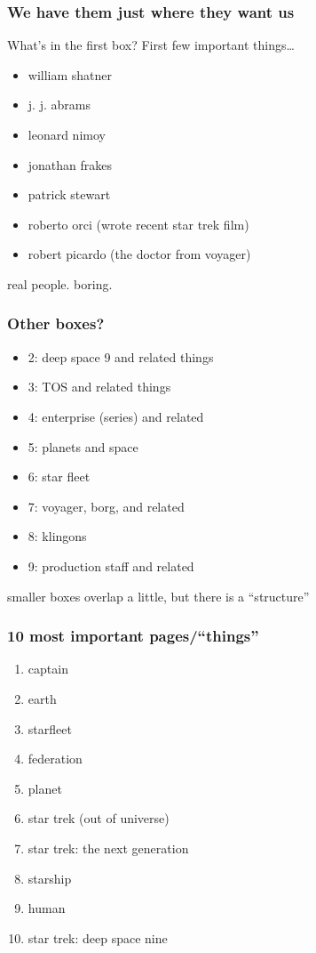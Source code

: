 \documentclass{beamer}
\begin{document}
\begin{frame}
  \frametitle{We have them just where they want us}
  What's in the first box? First few important things\ldots

  \begin{itemize}
    \item william shatner
    \item j. j. abrams
    \item leonard nimoy
    \item jonathan frakes
    \item patrick stewart
    \item roberto orci (wrote recent star trek film)
    \item robert picardo (the doctor from voyager)
  \end{itemize}

  real people. boring.
\end{frame}

\begin{frame}
  \frametitle{Other boxes?}
    \begin{itemize}
      \item 2: deep space 9 and related things
      \item 3: TOS and related things
      \item 4: enterprise (series) and related
      \item 5: planets and space
      \item 6: star fleet
      \item 7: voyager, borg, and related
      \item 8: klingons
      \item 9: production staff and related
    \end{itemize}

    smaller boxes overlap a little, but there is a ``structure''
\end{frame}

\begin{frame}
  \frametitle{10 most important pages/``things''}
  \begin{enumerate}
    \item<10-> captain
    \item<9-> earth
    \item<8-> starfleet
    \item<7-> federation
    \item<6-> planet
    \item<5-> star trek (out of universe)
    \item<4-> star trek: the next generation
    \item<3-> starship
    \item<2-> human
    \item<1-> star trek: deep space nine
  \end{enumerate}
\end{frame}
\end{document}
